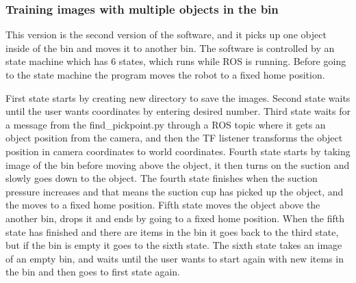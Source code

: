 \subsubsection{Training images with multiple objects in the bin}
This version is the second version of the software, and it picks up one object inside of the bin and moves it to another bin.
The software is controlled by an state machine which has 6 states, which runs while ROS is running. Before going to the state machine the program moves the robot to a fixed home position. 

First state starts by creating new directory to save the images. 
Second state waits until the user wants coordinates by entering desired number. 
Third state waits for a message from the find\_pickpoint.py through a ROS topic where it gets an object position from the camera, and then the TF listener transforms the object position in camera coordinates to world coordinates.
Fourth state starts by taking image of the bin before moving above the object, it then turns on the suction and slowly goes down to the object.  The fourth state finishes when the suction pressure increases and that means the suction cup has picked up the object, and the moves to a fixed home position.
Fifth state moves the object above the another bin, drops it and ends by going to a fixed home position. When the fifth state has finished and there are items in the bin it goes back to the third state, but if the bin is empty it goes to the sixth state.
The sixth state takes an image of an empty bin, and waits until the user wants to start
again with new items in the bin and then goes to first state again. 


